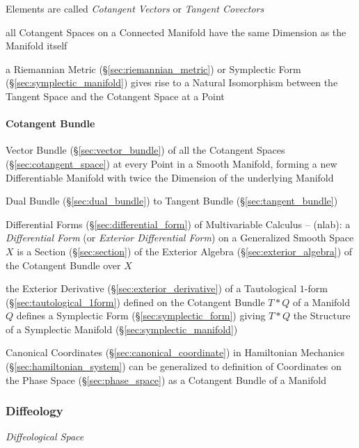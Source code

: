Elements are called \emph{Cotangent Vectors} or \emph{Tangent Covectors}

all Cotangent Spaces on a Connected Manifold have the same Dimension as the
Manifold itself

a Riemannian Metric (\S\ref{sec:riemannian_metric}) or Symplectic Form
(\S\ref{sec:symplectic_manifold}) gives rise to a Natural Isomorphism between
the Tangent Space and the Cotangent Space at a Point



\paragraph{Cotangent Bundle}\label{sec:cotangent_bundle}\hfill

Vector Bundle (\S\ref{sec:vector_bundle}) of all the Cotangent Spaces
(\S\ref{sec:cotangent_space}) at every Point in a Smooth Manifold, forming a
new Differentiable Manifold with twice the Dimension of the underlying Manifold

Dual Bundle (\S\ref{sec:dual_bundle}) to Tangent Bundle
(\S\ref{sec:tangent_bundle})

\fist Differential Forms (\S\ref{sec:differential_form}) of Multivariable
Calculus -- (nlab): a \emph{Differential Form} (or \emph{Exterior Differential
  Form}) on a Generalized Smooth Space $X$ is a Section (\S\ref{sec:section}) of
the Exterior Algebra (\S\ref{sec:exterior_algebra}) of the Cotangent Bundle over
$X$

the Exterior Derivative (\S\ref{sec:exterior_derivative}) of a Tautological
$1$-form (\S\ref{sec:tautological_1form}) defined on the Cotangent Bundle $T *
Q$ of a Manifold $Q$ defines a Symplectic Form (\S\ref{sec:symplectic_form})
giving $T * Q$ the Structure of a Symplectic Manifold
(\S\ref{sec:symplectic_manifold})

Canonical Coordinates (\S\ref{sec:canonical_coordinate}) in Hamiltonian
Mechanics (\S\ref{sec:hamiltonian_system}) can be generalized to definition of
Coordinates on the Phase Space (\S\ref{sec:phase_space}) as a Cotangent Bundle
of a Manifold



\subsubsection{Diffeology}\label{sec:diffeology}

\emph{Diffeological Space}



